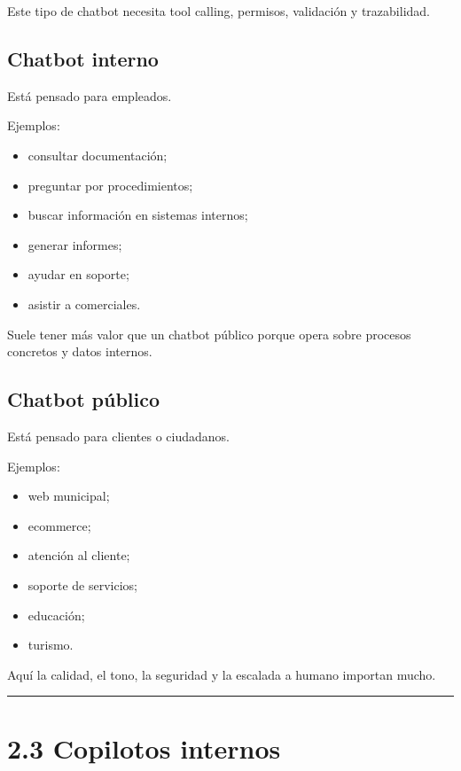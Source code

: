 Este tipo de chatbot necesita tool calling, permisos, validación y
trazabilidad.

\subsection{Chatbot interno}\label{chatbot-interno}

Está pensado para empleados.

Ejemplos:

\begin{itemize}
\tightlist
\item
  consultar documentación;
\item
  preguntar por procedimientos;
\item
  buscar información en sistemas internos;
\item
  generar informes;
\item
  ayudar en soporte;
\item
  asistir a comerciales.
\end{itemize}

Suele tener más valor que un chatbot público porque opera sobre procesos
concretos y datos internos.

\subsection{Chatbot público}\label{chatbot-puxfablico}

Está pensado para clientes o ciudadanos.

Ejemplos:

\begin{itemize}
\tightlist
\item
  web municipal;
\item
  ecommerce;
\item
  atención al cliente;
\item
  soporte de servicios;
\item
  educación;
\item
  turismo.
\end{itemize}

Aquí la calidad, el tono, la seguridad y la escalada a humano importan
mucho.

\begin{center}\rule{0.5\linewidth}{0.5pt}\end{center}

\section{2.3 Copilotos internos}\label{copilotos-internos}


